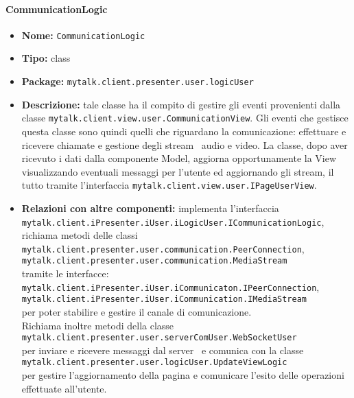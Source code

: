 \paragraph{CommunicationLogic}{
	\begin{itemize}
		\item [] \textbf{Nome:} \texttt{CommunicationLogic}
		\item [] \textbf{Tipo:} class
		\item [] \textbf{Package:} \texttt{mytalk.client.presenter.user.logicUser}
		\item [] \textbf{Descrizione:} tale classe ha il compito di gestire gli eventi provenienti dalla classe \texttt{mytalk.client.view.user.CommunicationView}. Gli eventi che gestisce questa classe sono quindi quelli che riguardano la comunicazione: effettuare e ricevere chiamate e gestione degli stream\g~ audio e video.
		La classe, dopo aver ricevuto i dati dalla componente Model, aggiorna opportunamente la View visualizzando eventuali messaggi per l'utente ed aggiornando gli stream\g, il tutto tramite l'interfaccia \texttt{mytalk.client.view.user.IPageUserView}.
		\item [] \textbf{Relazioni con altre componenti:} implementa l'interfaccia\\ \texttt{mytalk.client.iPresenter.iUser.iLogicUser.ICommunicationLogic},\\ richiama metodi delle classi\\ \texttt{mytalk.client.presenter.user.communication.PeerConnection},\\  \texttt{mytalk.client.presenter.user.communication.MediaStream}\\ tramite le interfacce:\\ \texttt{mytalk.client.iPresenter.iUser.iCommunicaton.IPeerConnection},\\  \texttt{mytalk.client.iPresenter.iUser.iCommunication.IMediaStream}\\
		per poter stabilire  e gestire il canale di comunicazione.\\
		Richiama inoltre metodi della classe\\ \texttt{mytalk.client.presenter.user.serverComUser.WebSocketUser}\\ per inviare e ricevere messaggi dal server\g~ e comunica con la classe\\ \texttt{mytalk.client.presenter.user.logicUser.UpdateViewLogic}\\ per gestire l'aggiornamento della pagina e comunicare l'esito delle operazioni effettuate all'utente.
	\end{itemize}
}
